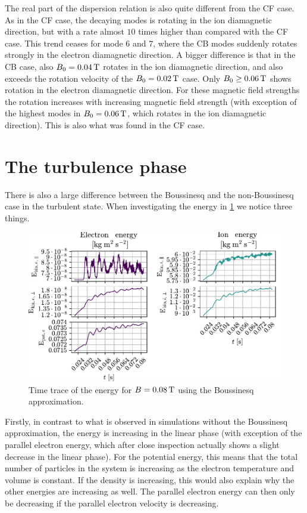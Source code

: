 The real part of the dispersion relation is also quite different from the CF case.
As in the CF case, the decaying modes is rotating in the ion diamagnetic direction, but with a rate almost $10$ times higher than compared with the CF case.
This trend ceases for mode $6$ and $7$, where the CB modes suddenly rotates strongly in the electron diamagnetic direction.
A bigger difference is that in the CB case, also $B_0 = 0.04\, \text{T}$ rotates in the ion diamagnetic direction, and also exceeds the rotation velocity of the $B_0 = 0.02\, \text{T}$ case.
Only $B_0 \geq 0.06\, \text{T}$ shows rotation in the electron diamagnetic direction.
For these magnetic field strengths the rotation increases with increasing magnetic field strength (with exception of the highest modes in $B_0 = 0.06\, \text{T}$, which rotates in the ion diamagnetic direction).
This is also what was found in the CF case.

\section{The turbulence phase}
\label{sec:turbB}
%
There is also a large difference between the Boussinesq and the non-Boussinesq case in the turbulent state.
When investigating the energy in \cref{fig:energies008B} we notice three things.
%
\begin{figure}[htb]
    \centering
    \includegraphics{fig/results/compareBouss/energies008B}
    \caption{Time trace of the energy for $B=0.08\, \text{T}$ using the Boussinesq approximation.}
    \label{fig:energies008B}
\end{figure}
%
Firstly, in contrast to what is observed in simulations without the Boussinesq approximation, the energy is increasing in the linear phase (with exception of the parallel electron energy, which after close inspection actually shows a slight decrease in the linear phase).
For the potential energy, this means that the total number of particles in the system is increasing as the electron temperature and volume is constant.
If the density is increasing, this would also explain why the other energies are increasing as well.
The parallel electron energy can then only be decreasing if the parallel electron velocity is decreasing.

